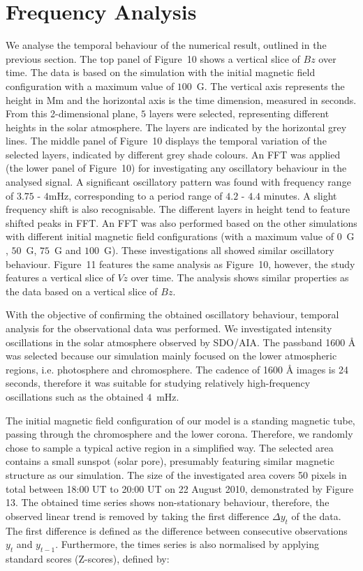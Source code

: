 \documentclass[physics,article,submit,pdftex,moreauthors]{Definitions/mdpi}
\begin{document}
\section{Frequency Analysis}

 We analyse the temporal behaviour of the numerical result, outlined in the previous section. The top panel of Figure~10 shows a vertical slice of $Bz$ over time.  The data is based on the simulation with the initial magnetic field configuration with a maximum value of $100$~G. The vertical axis represents the height in Mm and the horizontal axis is the time dimension, measured in seconds. From this 2-dimensional plane, $5$ layers were selected, representing different heights in the solar atmosphere. The layers are indicated by the horizontal grey lines.   The middle panel of Figure~10 displays the temporal variation of the selected layers, indicated by different grey shade colours. An FFT was applied (the lower panel of Figure~10) for investigating any oscillatory behaviour in the analysed signal. A significant oscillatory pattern was found with frequency range of $3.75$ - $4$mHz, corresponding to a period range of $4.2$ - $4.4$ minutes. A slight frequency shift is also recognisable. The different layers in height tend to feature shifted peaks in FFT. An FFT was also performed based on the other simulations with different initial magnetic field configurations (with a maximum value of $0$~G , $50$~G,  $75$~G  and $100$~G). These investigations all showed similar oscillatory behaviour.  Figure~11 features the same analysis as Figure~10, however, the study features a vertical slice of $Vz$ over time. The analysis shows similar properties as the data based on a vertical slice of $Bz$.

With the objective of confirming the obtained oscillatory behaviour, temporal analysis for the observational data was performed. We investigated intensity oscillations in the solar atmosphere observed by SDO/AIA. The passband 1600 {\AA} was selected because our simulation mainly focused on the lower atmospheric regions, i.e. photosphere and chromosphere. The cadence of 1600 {\AA} images is 24 seconds, therefore it was suitable for studying relatively high-frequency oscillations such as the obtained $4$~mHz.

The initial magnetic field configuration of our model is a standing magnetic tube, passing through the chromosphere and the lower corona.  Therefore, we randomly chose to sample a typical active region in a simplified way. The  selected area contains a small sunspot (solar pore), presumably featuring similar magnetic structure as our simulation. The size of the investigated area covers 50 pixels in total between 18:00 UT to 20:00 UT on 22 August 2010, demonstrated by Figure 13. The obtained time series shows non-stationary behaviour, therefore, the observed linear trend is removed by taking the first difference $\Delta  y_{t}$ of the data. The first difference is defined as the difference between consecutive observations $y_{t}$ and $y_{t-1}$. Furthermore, the times series is also normalised by applying standard scores (Z-scores), defined by:
\end{document}
